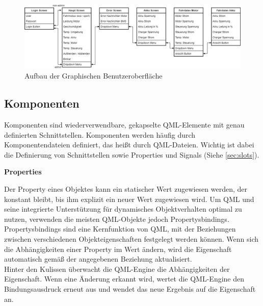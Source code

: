 \begin{figure}[H]
	\begin{center}
		\includegraphics[scale=0.4]{figures/hcis/gui_aufbau.png}
		\caption{Aufbau der Graphischen Benutzeroberfläche}
		\label{fig:aufbauGUI}
	\end{center}
\end{figure}

\newpage

\subsection{Komponenten}

Komponenten sind wiederverwendbare, gekapselte QML-Elemente mit genau definierten Schnittstellen. Komponenten werden häufig durch Komponentendateien definiert, das heißt durch QML-Dateien. Wichtig ist dabei die Definierung von Schnittstellen sowie Properties und Signals (Siehe \ref{sec:slots}).\\\medskip
\begin{large}
\textbf{Properties}\\\medskip
\end{large}

Der Property eines Objektes kann ein statischer Wert zugewiesen werden, der konstant bleibt, bis ihm explizit ein neuer Wert zugewiesen wird. Um QML und seine integrierte Unterstützung für dynamisches Objektverhalten optimal zu nutzen, verwenden die meisten QML-Objekte jedoch Propertysbindings.\\
Propertysbindings sind eine Kernfunktion von QML, mit der Beziehungen zwischen verschiedenen Objekteigenschaften festgelegt werden können. Wenn sich die Abhängigkeiten einer Property im Wert ändern, wird die Eigenschaft automatisch gemäß der angegebenen Beziehung aktualisiert.\\
Hinter den Kulissen überwacht die QML-Engine die Abhängigkeiten der Eigenschaft. Wenn eine Änderung erkannt wird, wertet die QML-Engine den Bindungsausdruck erneut aus und wendet das neue Ergebnis auf die Eigenschaft an.





